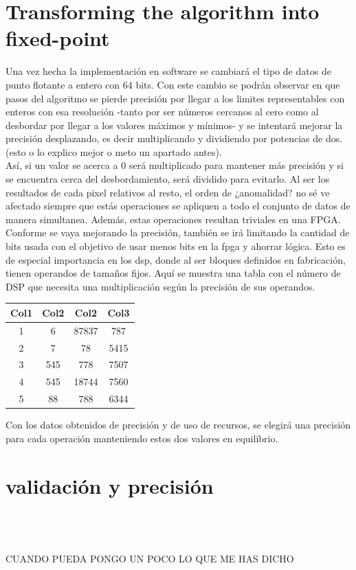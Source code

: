 \section{Transforming the algorithm into fixed-point}
Una vez hecha la implementación en software se cambiará el tipo de datos de punto flotante a entero con 64 bits. Con este cambio se podrán observar en que pasos del algoritmo se pierde precisión por llegar a los limites representables con enteros con esa resolución -tanto por ser números cercanos al cero como al desbordar por llegar a los valores máximos y mínimos- y se intentará mejorar la precisión desplazando, es decir multiplicando y dividiendo por potencias de dos. (esto o lo explico mejor o meto un apartado antes).
\\
Así, si un valor se acerca a 0 será multiplicado para mantener más precisión y si se encuentra cerca del desbordamiento, será dividido para evitarlo. Al ser los resultados de cada pixel relativos al resto, el orden de ¿anomalidad? no sé ve afectado siempre que estás operaciones se apliquen a todo el conjunto de datos de manera simultanea. Además, estas operaciones resultan triviales en una FPGA.
\\
Conforme se vaya mejorando la precisión, también se irá limitando la cantidad de bits usada con el objetivo de usar menos bits en la fpga y ahorrar lógica. Esto es de especial importancia en los dsp, donde al ser bloques definidos en fabricación, tienen operandos de tamaños fijos. Aquí se muestra una tabla con el número de DSP que necesita una multiplicación según la precisión de sus operandos.
\\
\begin{center}
 \begin{tabular}{||c c c c||} 
 \hline
 Col1 & Col2 & Col2 & Col3 \\ [0.5ex] 
 \hline\hline
 1 & 6 & 87837 & 787 \\ 
 \hline
 2 & 7 & 78 & 5415 \\
 \hline
 3 & 545 & 778 & 7507 \\
 \hline
 4 & 545 & 18744 & 7560 \\
 \hline
 5 & 88 & 788 & 6344 \\ [1ex] 
 \hline
\end{tabular}
\end{center}

Con los datos obtenidos de precisión y de uso de recursos, se elegirá una precisión para cada operación manteniendo estos dos valores en equilibrio.

\section{validación y precisión}
\\
\\
\\
CUANDO PUEDA PONGO UN POCO LO QUE ME HAS DICHO
\\
\\
\\